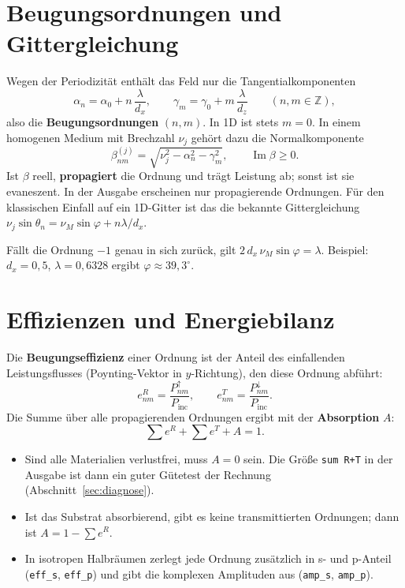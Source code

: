 \section{Beugungsordnungen und Gittergleichung}
%
Wegen der Periodizität enthält das Feld nur die Tangentialkomponenten
\begin{equation}
  \alpha_n = \alpha_0 + n\,\frac{\lambda}{d_x},\qquad \gamma_m = \gamma_0 + m\,\frac{\lambda}{d_z}
  \qquad (n,m\in\mathbb Z),
\end{equation}
also die \textbf{Beugungsordnungen} $(n,m)$. In 1D ist stets $m=0$. In einem homogenen Medium mit Brechzahl $\nu_j$
gehört dazu die Normalkomponente
\begin{equation}
  \beta_{nm}^{(j)}=\sqrt{\nu_j^2-\alpha_n^2-\gamma_m^2},\qquad \operatorname{Im}\beta\ge0 .
\end{equation}
Ist $\beta$ reell, \textbf{propagiert} die Ordnung und trägt Leistung ab; sonst ist sie evaneszent. In der Ausgabe
erscheinen nur propagierende Ordnungen. Für den klassischen Einfall auf ein 1D-Gitter ist das die bekannte
Gittergleichung $\nu_j\sin\theta_n = \nu_M\sin\varphi + n\lambda/d_x$.

\begin{tipp}
Fällt die Ordnung $-1$ genau in sich zurück, gilt $2\,d_x\,\nu_M\sin\varphi = \lambda$. Beispiel: $d_x=0{,}5$\um,
$\lambda=0{,}6328$\um{} ergibt $\varphi\approx 39{,}3^\circ$.
\end{tipp}

\section{Effizienzen und Energiebilanz}
%
Die \textbf{Beugungseffizienz} einer Ordnung ist der Anteil des einfallenden Leistungsflusses (Poynting-Vektor in
$y$-Richtung), den diese Ordnung abführt:
\begin{equation}
  e^{R}_{nm} = \frac{P^{\uparrow}_{nm}}{P_{\text{inc}}},\qquad e^{T}_{nm} = \frac{P^{\downarrow}_{nm}}{P_{\text{inc}}} .
\end{equation}
Die Summe über alle propagierenden Ordnungen ergibt mit der \textbf{Absorption} $A$:
\begin{equation}
  \sum e^R + \sum e^T + A = 1 .
\end{equation}
\begin{itemize}
  \item Sind alle Materialien verlustfrei, muss $A=0$ sein. Die Größe \texttt{sum R+T} in der Ausgabe ist dann ein
        guter Gütetest der Rechnung (Abschnitt~\ref{sec:diagnose}).
  \item Ist das Substrat absorbierend, gibt es keine transmittierten Ordnungen; dann ist $A = 1-\sum e^R$.
  \item In isotropen Halbräumen zerlegt \FG{} jede Ordnung zusätzlich in s- und p-Anteil (\texttt{eff\_s},
        \texttt{eff\_p}) und gibt die komplexen Amplituden aus (\texttt{amp\_s}, \texttt{amp\_p}).
\end{itemize}

